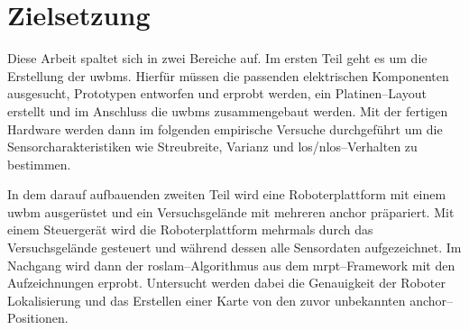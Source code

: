 \begin{comment}
------------------------------------------------------------------------------------------
\end{comment}


\begin{comment}
------------------------------------------------------------------------------------------
- Beschreiben Sie das Ziel Ihres Forschungsvorhabens.
- Was wollen Sie am Ende herausgefunden haben und weshalb?
- Welche Ziele sollen erreicht werden?
	- Aufbau von UWB Hardware
	- Testen der Out-Of-Box UWB Hardware mit einem RO-SLAM Algorithmus
- Ziele:
	- UWB Hardware aufbauen
	- Charakteristik bestimmen {Streubreite, Varianz, LOS/NLOS, Kalibierung?}
	- Roboterplattform mit UWB Hardware ausrüsten;
	- MRPT--Software konfigurieren;
	- Lokalisierung vergleichen mit {Odometry; LaserOdometry; Ground TRuth; RO-SLAM}
\end{comment}
\section{Zielsetzung}

Diese Arbeit spaltet sich in zwei Bereiche auf. Im ersten Teil geht es um die Erstellung der \Glspl{uwbm}. Hierfür müssen die passenden elektrischen Komponenten ausgesucht, Prototypen entworfen und erprobt werden, ein Platinen--Layout erstellt und im Anschluss die \Glspl{uwbm} zusammengebaut werden. Mit der fertigen Hardware werden dann im folgenden empirische Versuche durchgeführt um die Sensorcharakteristiken wie Streubreite, Varianz und \Gls{los}/\Gls{nlos}--Verhalten zu bestimmen.

In dem darauf aufbauenden zweiten Teil wird eine Roboterplattform mit einem \Gls{uwbm} ausgerüstet und ein Versuchsgelände mit mehreren \Gls{anchor} präpariert. Mit einem Steuergerät wird die Roboterplattform mehrmals durch das Versuchsgelände gesteuert und während dessen alle Sensordaten aufgezeichnet.
Im Nachgang wird dann der \Gls{roslam}--Algorithmus aus dem \Gls{mrpt}--Framework mit den Aufzeichnungen erprobt. Untersucht werden dabei die Genauigkeit der Roboter Lokalisierung und das Erstellen einer Karte von den zuvor unbekannten \Gls{anchor}--Positionen.


\begin{comment}
------------------------------------------------------------------------------------------
- Ein weiterer interessanter Punkt sind die Abgrenzungen. Betrachtest du nur einen kleinen Problemfall aus einem großen Themenbereich kannst du in der Einleitung bereits darlegen, welche Aspekte du leider nicht berücksichtigen kannst.
\end{comment}



